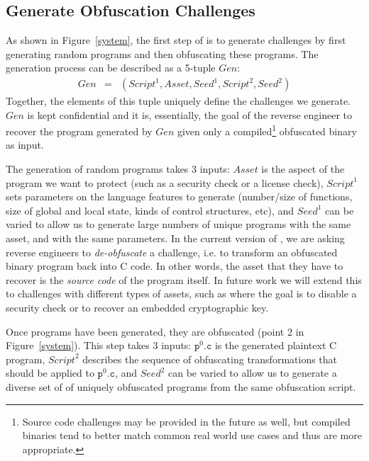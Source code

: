 \subsection{Generate Obfuscation Challenges}
\label{sec:generate}
As shown in Figure~\ref{system}, the first step of \revenge is to generate challenges by first generating random programs and then obfuscating these programs. The generation process can be described as a 5-tuple $\mathit{Gen}$:
\begin{eqnarray}
\label{gentuple}
   \mathit{Gen} & = & 
   (
      \mathit{Script}^1,
      \mathit{Asset},
      \mathit{Seed}^1,
      \mathit{Script}^2,
      \mathit{Seed}^2
   )
\end{eqnarray}
 Together, the elements of this tuple uniquely define the challenges we generate. $\mathit{Gen}$ is kept confidential and it is, essentially, the goal of the reverse engineer to recover the program generated by $\mathit{Gen}$ given only a compiled\footnote{Source code challenges may be provided in the future as well, but compiled binaries tend to better match common real world use cases and thus are more appropriate.} obfuscated binary as input.  

The generation of random programs takes 3 inputs: $\mathit{Asset}$ is the aspect of the program we want to protect (such as a security check or a license check), $\mathit{Script}^1$ sets parameters on the language features to generate (number/size of functions, size of global and local state, kinds of control structures, etc), and $\mathit{Seed}^1$ can be varied to allow us to generate large numbers of unique programs with the same asset, and with the same parameters. In the current version of \revenge, we are asking reverse engineers to {\em de-obfuscate} a challenge, i.e. to transform an obfuscated binary program back into C code. In other words, the asset that they have to recover is the {\em source code} of the program itself. In future work we will extend this to challenges with different types of assets, such as where the goal is to disable a security check or to recover an embedded cryptographic key.

Once programs have been generated, they are obfuscated (point 2 in Figure~\ref{system}). This step takes 3 inputs:  $\mathtt{p}^0.\mathtt{c}$ is the generated plaintext C program, $\mathit{Script}^2$ describes the sequence of obfuscating transformations that should be applied to $\mathtt{p}^0.\mathtt{c}$, and $\mathit{Seed}^2$ can be varied to allow us to generate a diverse set of of uniquely obfuscated programs from the same obfuscation script.

